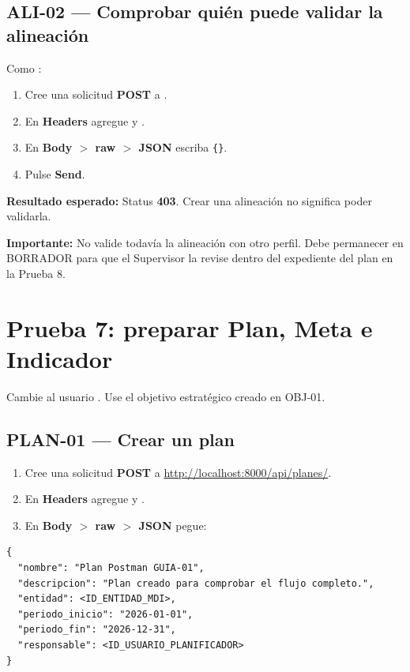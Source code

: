 \documentclass[11pt,a4paper]{article}
\newcommand{\esperado}[1]{\textcolor{VerdeResultado}{\textbf{Resultado esperado:}} #1}
\newcommand{\atencion}[1]{\textcolor{RojoAtencion}{\textbf{Importante:}} #1}
\begin{document}
\subsection{ALI-02 --- Comprobar quién puede validar la alineación}

Como :

\begin{enumerate}
  \item Cree una solicitud \textbf{POST} a .
  \item En \textbf{Headers} agregue  y .
  \item En \textbf{Body $>$ raw $>$ JSON} escriba \texttt{\{\}}.
  \item Pulse \textbf{Send}.
\end{enumerate}

\esperado{Status \textbf{403}. Crear una alineación no significa poder validarla.}

\atencion{No valide todavía la alineación con otro perfil. Debe permanecer en BORRADOR para que el Supervisor la revise dentro del expediente del plan en la Prueba 8.}

\section{Prueba 7: preparar Plan, Meta e Indicador}

Cambie al usuario . Use el objetivo estratégico creado en OBJ-01.

\subsection{PLAN-01 --- Crear un plan}

\begin{enumerate}
  \item Cree una solicitud \textbf{POST} a \url{http://localhost:8000/api/planes/}.
  \item En \textbf{Headers} agregue  y .
  \item En \textbf{Body $>$ raw $>$ JSON} pegue:
\end{enumerate}

\begin{lstlisting}
{
  "nombre": "Plan Postman GUIA-01",
  "descripcion": "Plan creado para comprobar el flujo completo.",
  "entidad": <ID_ENTIDAD_MDI>,
  "periodo_inicio": "2026-01-01",
  "periodo_fin": "2026-12-31",
  "responsable": <ID_USUARIO_PLANIFICADOR>
}
\end{lstlisting}
\end{document}

